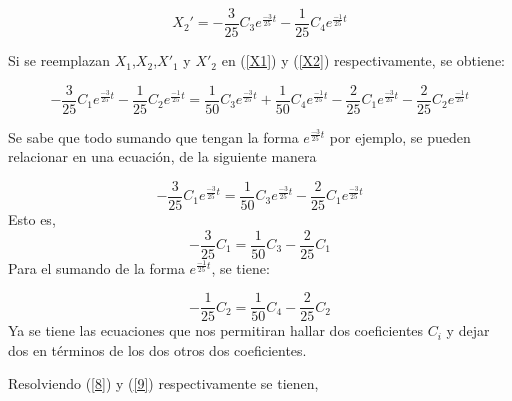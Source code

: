 \documentclass[titlepage]{article}
\begin{document}
                    \begin{equation*}
                        X_2' = -\frac{3}{25}C_3e^{\frac{-3}{25}t} - \frac{1}{25}C_4e^{\frac{-1}{25}t}   
                    \end{equation*}\vspace{0.2cm}
                    
                Si se reemplazan $X_1$,$X_2$,$X'_1$ y $X'_2$ en (\ref{X1}) y (\ref{X2}) respectivamente, se obtiene: 
            
                    \begin{equation*}
                        -\frac{3}{25}C_1e^{\frac{-3}{25}t} -  \frac{1}{25}C_2e^{\frac{-1}{25}t} = \frac{1}{50}C_3e^{\frac{-3}{25}t} + \frac{1}{50} C_4e^{\frac{-1}{25}t} - \frac{2}{25}C_1e^{\frac{-3}{25}t} - \frac{2}{25} C_2e^{\frac{-1}{25}t}
                    \end{equation*}
                
                Se sabe que todo sumando que tengan la forma $e^{\frac{-3}{25}t}$ por ejemplo, se pueden relacionar en una ecuación, de la siguiente manera
                
                    \begin{equation*}
                        -\frac{3}{25}C_1e^{\frac{-3}{25}t} = \frac{1}{50}C_3e^{\frac{-3}{25}t} - \frac{2}{25}C_1e^{\frac{-3}{25}t} 
                    \end{equation*}\vspace{0.2cm}
                Esto es, \vspace{0.2cm}
                    \begin{equation}
                        -\frac{3}{25}C_1 = \frac{1}{50}C_3 - \frac{2}{25}C_1 
                        \label{8}
                    \end{equation}\vspace{0.2cm}
                Para el sumando de la forma $e^{\frac{-1}{25}t}$, se tiene:
                
                    \begin{equation}
                        -\frac{1}{25}C_2 = \frac{1}{50}C_4 - \frac{2}{25}C_2 
                        \label{9}
                    \end{equation}
                Ya se tiene las ecuaciones que nos permitiran hallar dos coeficientes $C_i$ y dejar dos en términos de los dos otros dos coeficientes.
                    
                Resolviendo (\ref{8}) y (\ref{9}) respectivamente se tienen,\par
                
\end{document}
